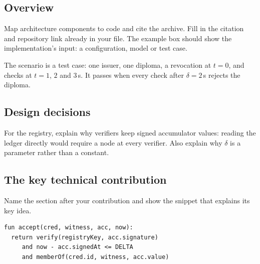 \subsection[Overview]{Overview\skimmark}\label{app:chapters:impl-overview}
Map architecture components to code and cite the archive. Fill in the citation and repository link already in your file. The example box should show the implementation's input: a configuration, model or test case.
\begin{runningexample}[as input]
The scenario is a test case: one issuer, one diploma, a revocation at $t = 0$, and checks at $t = 1$, $2$ and $3$\,s. It passes when every check after $\delta = 2$\,s rejects the diploma.
\end{runningexample}

\subsection{Design decisions}\label{app:chapters:design-decisions}
For the registry, explain why verifiers keep signed accumulator values: reading the ledger directly would require a node at every verifier. Also explain why $\delta$ is a parameter rather than a constant.

\subsection[The key technical contribution]{The key technical contribution\skimmark}\label{app:chapters:key-contribution}
Name the section after your contribution and show the snippet that explains its key idea.
\begin{lstlisting}[caption={The verifier's check: the accumulator value is signed and younger than $\delta$, and the holder's witness shows the credential is still in it.}, label={lst:guide:key}]
fun accept(cred, witness, acc, now):
  return verify(registryKey, acc.signature)
     and now - acc.signedAt <= DELTA
     and memberOf(cred.id, witness, acc.value)
\end{lstlisting}

